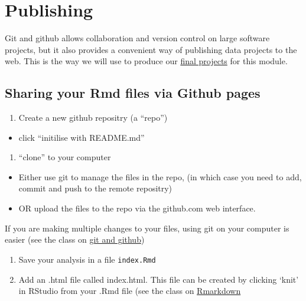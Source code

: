 \documentclass[
]{book}
\providecommand{\tightlist}{%
  \setlength{\itemsep}{0pt}\setlength{\parskip}{0pt}}
\begin{document}
\hypertarget{publishing}{%
\chapter{Publishing}\label{publishing}}

Git and github allows collaboration and version control on large software projects, but it also provides a convenient way of publishing data projects to the web. This is the way we will use to produce our \href{final-project.html}{final projects} for this module.

\hypertarget{sharing-your-rmd-files-via-github-pages}{%
\section{Sharing your Rmd files via Github pages}\label{sharing-your-rmd-files-via-github-pages}}

\begin{enumerate}
\def\labelenumi{\arabic{enumi}.}
\tightlist
\item
  Create a new github repositry (a ``repo'')
\end{enumerate}

\begin{itemize}
\tightlist
\item
  click ``initilise with README.md''
\end{itemize}

\begin{enumerate}
\def\labelenumi{\arabic{enumi}.}
\setcounter{enumi}{1}
\tightlist
\item
  ``clone'' to your computer
\end{enumerate}

\begin{itemize}
\tightlist
\item
  Either use git to manage the files in the repo, (in which case you need to add, commit and push to the remote repositry)
\item
  OR upload the files to the repo via the github.com web interface.
\end{itemize}

If you are making multiple changes to your files, using git on your computer is easier (see the class on \href{git-and-github.html}{git and github})

\begin{enumerate}
\def\labelenumi{\arabic{enumi}.}
\setcounter{enumi}{2}
\item
  Save your analysis in a file \texttt{index.Rmd}
\item
  Add an .html file called index.html. This file can be created by clicking `knit' in RStudio from your .Rmd file (see the class on \href{rmarkdown.html}{Rmarkdown}
\end{enumerate}
\end{document}
